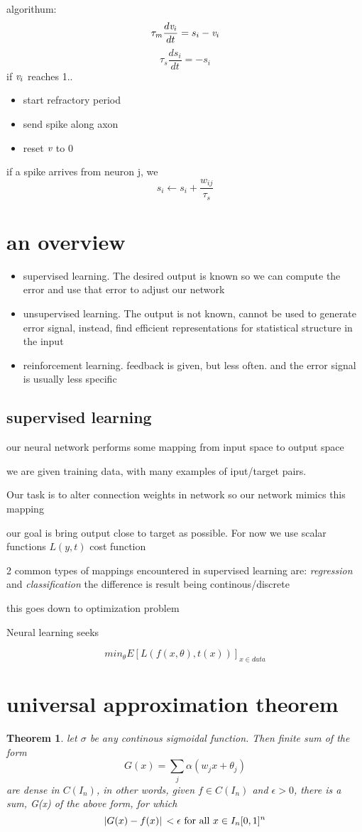 \documentclass[10pt]{article}
\theoremstyle{break}
\newtheorem{thm}{Theorem}[subsection]
\begin{document}
algorithum:
$$\tau_m\frac{d\emph{v}_i}{dt}=s_i-\emph{v}_i$$
$$\tau_s \frac{ds_i}{dt}=-s_i$$
if $\emph{v}_i$ reaches 1..
\begin{itemize}
    \item start refractory period 
    \item send spike along axon 
    \item reset $\emph{v}$ to 0
\end{itemize}
if a spike arrives from neuron j, we 
$$s_i\leftarrow s_i+\frac{w_{ij}}{\tau_s}$$

\section{an overview}
\begin{itemize}
    \item supervised learning. The desired output is known so we can compute the error and use that error to adjust our network
    \item unsupervised learning. The output is not known, cannot be used to generate error signal, instead, find efficient representations for statistical structure in the input
    \item reinforcement learning. feedback is given, but less often. and the error signal is usually less specific 
\end{itemize}

\subsection{supervised learning}
our neural network performs some mapping from input space to output space 

we are given training data, with many examples of iput/target pairs. 

Our task is to alter connection weights in network so our network mimics this mapping

our goal is bring output close to target as possible. For now we use scalar functions $L(y,t)$ cost function 

2 common types of mappings encountered in supervised learning are: \emph{regression} and \emph{classification} the difference is result being continous/discrete

this goes down to optimization problem 

Neural learning seeks 

$$min_\theta E[L(f(x,\theta), t(x))]_{x\in data}$$

\section{universal approximation theorem}
\begin{thm}
    let $\sigma$ be any continous sigmoidal function. Then finite sum of the form 
    $$G(x)=\sum_j\alpha(w_jx+\theta_j)$$ are dense in $C(I_n)$, in 
    other words, given $f\in C(I_n)$ and $\epsilon>0$, there is a sum, G(x)
    of the above form, for which $$\abs*{G(x)-f(x)}<\epsilon \text{ for all }x\in I_n [0,1]^n$$
\end{thm}
\end{document}
